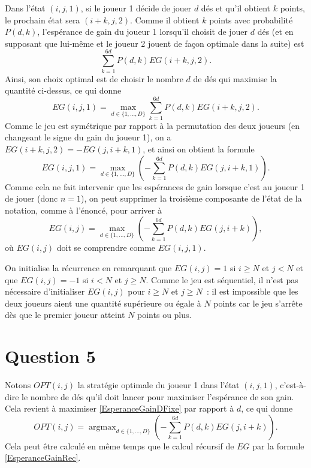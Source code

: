 \documentclass[a4paper,11pt]{amsart}
\theoremstyle{plain}
\DeclareMathOperator*{\argmax}{argmax}
\begin{document}
Dans l'état $(i, j, 1)$, si le joueur 1 décide de jouer $d$ dés et qu'il obtient $k$ points, le prochain état sera $(i+k, j, 2)$. Comme il obtient $k$ points avec probabilité $P(d, k)$, l'espérance de gain du joueur 1 lorsqu'il choisit de jouer $d$ dés (et en supposant que lui-même et le joueur 2 jouent de façon optimale dans la suite) est
\begin{equation}
\label{EsperanceGainDFixe}
\sum_{k=1}^{6d} P(d, k) EG(i+k, j, 2).
\end{equation}
Ainsi, son choix optimal est de choisir le nombre $d$ de dés qui maximise la quantité ci-dessus, ce qui donne
\[
EG(i, j, 1) = \max_{d \in \{1, \dotsc, D\}} \sum_{k=1}^{6d} P(d, k) EG(i+k, j, 2).
\]
Comme le jeu est symétrique par rapport à la permutation des deux joueurs (en changeant le signe du gain du joueur 1), on a $EG(i+k, j, 2) = -EG(j, i+k, 1)$, et ainsi on obtient la formule
\[
EG(i, j, 1) = \max_{d \in \{1, \dotsc, D\}} \left(-\sum_{k=1}^{6d} P(d, k) EG(j, i+k, 1)\right).
\]
Comme cela ne fait intervenir que les espérances de gain lorsque c'est au joueur 1 de jouer (donc $n = 1$), on peut supprimer la troisième composante de l'état de la notation, comme à l'énoncé, pour arriver à
\begin{equation}
\label{EsperanceGainRec}
EG(i, j) = \max_{d \in \{1, \dotsc, D\}} \left(-\sum_{k=1}^{6d} P(d, k) EG(j, i+k)\right),
\end{equation}
où $EG(i, j)$ doit se comprendre comme $EG(i, j, 1)$.

On initialise la récurrence en remarquant que $EG(i, j) = 1$ si $i \geq N$ et $j < N$ et que $EG(i, j) = -1$ si $i < N$ et $j \geq N$. Comme le jeu est séquentiel, il n'est pas nécessaire d'initialiser $EG(i, j)$ pour $i \geq N$ et $j \geq N$~: il est impossible que les deux joueurs aient une quantité supérieure ou égale à $N$ points car le jeu s'arrête dès que le premier joueur atteint $N$ points ou plus.

\section{Question 5}

Notons $OPT(i, j)$ la stratégie optimale du joueur 1 dans l'état $(i, j, 1)$, c'est-à-dire le nombre de dés qu'il doit lancer pour maximiser l'espérance de son gain. Cela revient à maximiser \eqref{EsperanceGainDFixe} par rapport à $d$, ce qui donne
\[
OPT(i, j) = \argmax_{d \in \{1, \dotsc, D\}} \left(-\sum_{k=1}^{6d} P(d, k) EG(j, i+k)\right).
\]
Cela peut être calculé en même temps que le calcul récursif de $EG$ par la formule \eqref{EsperanceGainRec}.
\end{document}
